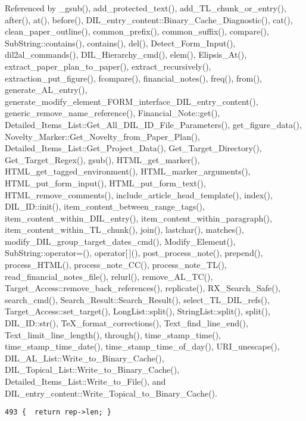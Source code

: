 Referenced by \_\-gsub(), add\_\-protected\_\-text(), add\_\-TL\_\-chunk\_\-or\_\-entry(), after(), at(), before(), DIL\_\-entry\_\-content::Binary\_\-Cache\_\-Diagnostic(), cat(), clean\_\-paper\_\-outline(), common\_\-prefix(), common\_\-suffix(), compare(), Sub\-String::contains(), contains(), del(), Detect\_\-Form\_\-Input(), dil2al\_\-commands(), DIL\_\-Hierarchy\_\-cmd(), elem(), Elipsis\_\-At(), extract\_\-paper\_\-plan\_\-to\_\-paper(), extract\_\-recursively(), extraction\_\-put\_\-figure(), fcompare(), financial\_\-notes(), freq(), from(), generate\_\-AL\_\-entry(), generate\_\-modify\_\-element\_\-FORM\_\-interface\_\-DIL\_\-entry\_\-content(), generic\_\-remove\_\-name\_\-reference(), Financial\_\-Note::get(), Detailed\_\-Items\_\-List::Get\_\-All\_\-DIL\_\-ID\_\-File\_\-Parameters(), get\_\-figure\_\-data(), Novelty\_\-Marker::Get\_\-Novelty\_\-from\_\-Paper\_\-Plan(), Detailed\_\-Items\_\-List::Get\_\-Project\_\-Data(), Get\_\-Target\_\-Directory(), Get\_\-Target\_\-Regex(), gsub(), HTML\_\-get\_\-marker(), HTML\_\-get\_\-tagged\_\-environment(), HTML\_\-marker\_\-arguments(), HTML\_\-put\_\-form\_\-input(), HTML\_\-put\_\-form\_\-text(), HTML\_\-remove\_\-comments(), include\_\-article\_\-head\_\-template(), index(), DIL\_\-ID::init(), item\_\-content\_\-between\_\-range\_\-tags(), item\_\-content\_\-within\_\-DIL\_\-entry(), item\_\-content\_\-within\_\-paragraph(), item\_\-content\_\-within\_\-TL\_\-chunk(), join(), lastchar(), matches(), modify\_\-DIL\_\-group\_\-target\_\-dates\_\-cmd(), Modify\_\-Element(), Sub\-String::operator=(), operator[$\,$](), post\_\-process\_\-note(), prepend(), process\_\-HTML(), process\_\-note\_\-CC(), process\_\-note\_\-TL(), read\_\-financial\_\-notes\_\-file(), relurl(), remove\_\-AL\_\-TC(), Target\_\-Access::remove\_\-back\_\-references(), replicate(), RX\_\-Search\_\-Safe(), search\_\-cmd(), Search\_\-Result::Search\_\-Result(), select\_\-TL\_\-DIL\_\-refs(), Target\_\-Access::set\_\-target(), Long\-List::split(), String\-List::split(), split(), DIL\_\-ID::str(), Te\-X\_\-format\_\-corrections(), Text\_\-find\_\-line\_\-end(), Text\_\-limit\_\-line\_\-length(), through(), time\_\-stamp\_\-time(), time\_\-stamp\_\-time\_\-date(), time\_\-stamp\_\-time\_\-of\_\-day(), URI\_\-unescape(), DIL\_\-AL\_\-List::Write\_\-to\_\-Binary\_\-Cache(), DIL\_\-Topical\_\-List::Write\_\-to\_\-Binary\_\-Cache(), Detailed\_\-Items\_\-List::Write\_\-to\_\-File(), and DIL\_\-entry\_\-content::Write\_\-Topical\_\-to\_\-Binary\_\-Cache().



\footnotesize\begin{verbatim}493 {  return rep->len; }
\end{verbatim}\normalsize 
{}

